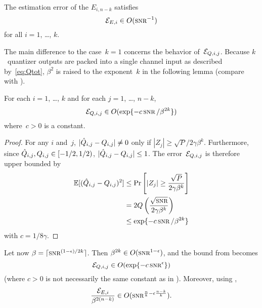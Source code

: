 \begin{lemma}
  \label{lem:Eedecayk}
  The estimation error of the $E_{i,n-k}$ satisfies
  \begin{equation*}
    \Err_{E,i} \in O(\snr^{-1})
  \end{equation*}
  for all $i = 1$, \dots, $k$. 
\end{lemma}

The main difference to the case~$k=1$ concerns the behavior of~${\mathcal{E}}_{Q,i,j}$.
Because $k$~quantizer outputs are packed into a single channel input as
described by~\eqref{eq:Qtot}, $\beta^2$ is raised to the exponent~$k$ in the
following lemma (compare with ).

\begin{lemma}
  \label{lem:eqboundk}
  For each $i = 1$, \dots, $k$ and for each $j = 1$, \dots, $n-k$,
  \begin{equation*}
    \Err_{Q,i,j} \in O(\exp\{-c \snr/\beta^{2k} \})
  \end{equation*}
  where~$c > 0$ is a constant.
\end{lemma}

\begin{proof}
  For any $i$ and~$j$, $| \hat{Q}_{i,j} - Q_{i,j}| \ne 0$ only if $|Z_j| \ge
  \sqrt{P} / 2 \gamma \beta^k$. Furthermore, since $\hat{Q}_{i,j}, Q_{i,j} \in
  [-1/2, 1/2)$, $|\hat{Q}_{i,j} - Q_{i,j}| \le 1$. The error~${\mathcal{E}}_{Q,i,j}$ is
  therefore upper bounded by
  \begin{align*}
    \E[(\Qh_{i,j} - Q_{i,j})^2] &\le \Pr\left[|Z_j| \ge \frac{\sqrt{P}}{2 \gamma
    \beta^k} \right] \\
    &= 2 Q\left( \frac{\sqrt{\snr}}{2\gamma\beta^k} \right) \\
    &\le \exp\{-c \snr / \beta^{2k} \}
  \end{align*}
  with $c = 1/8\gamma$.
\end{proof}


Let now $\beta = \lceil \snr^{(1-\e)/2k} \rceil$. Then $\beta^{2k} \in
O(\snr^{1-\e})$, and the bound from  becomes
\begin{equation}
  \label{eq:qboundkepsilon}
  \Err_{Q,i,j} \in O(\exp\{-c \snr^\e\})
\end{equation}
(where $c > 0$ is not necessarily the same constant as in ).
Moreover, using ,
\begin{equation}
  \label{eq:Eeboundkepsilon}
  \frac{\Err_{E,i}}{\beta^{2(n-k)}} \in O(\snr^{\frac{n}{k} - \e
  \frac{n-k}{k}}).
\end{equation}

